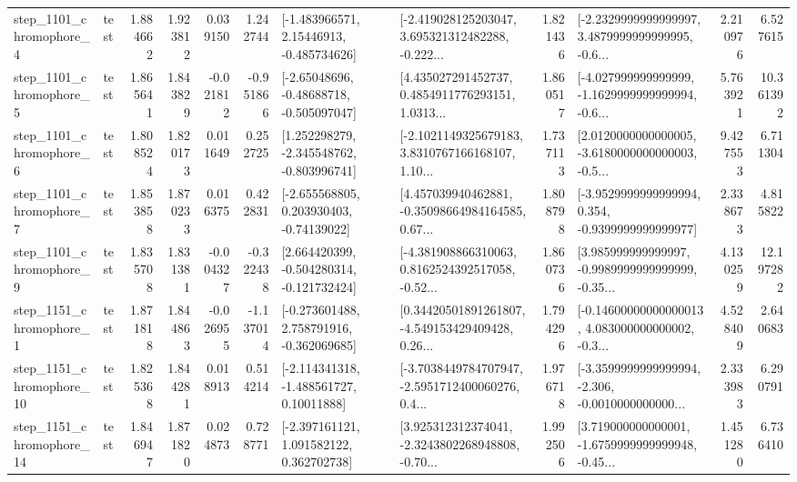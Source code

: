 \begin{tabular}{llrrrrllrlrr}
  step\_1101\_chromophore\_4 &      test &      1.884662 &    1.923812 &      0.039150 &  1.242744 &    [-1.483966571, 2.15446913, -0.485734626] &  [-2.419028125203047, 3.695321312482288, -0.222... &       1.821436 &  [-2.2329999999999997, 3.4879999999999995, -0.6... &            2.210976 &          6.527615 \\
  step\_1101\_chromophore\_5 &      test &      1.865641 &    1.843829 &     -0.021812 & -0.951866 &    [-2.65048696, -0.48688718, -0.505097047] &  [4.435027291452737, 0.4854911776293151, 1.0313... &       1.860517 &  [-4.027999999999999, -1.1629999999999994, -0.6... &            5.763921 &         10.361392 \\
  step\_1101\_chromophore\_6 &      test &      1.808524 &    1.820173 &      0.011649 &  0.252725 &   [1.252298279, -2.345548762, -0.803996741] &  [-2.1021149325679183, 3.8310767166168107, 1.10... &       1.737113 &  [2.0120000000000005, -3.6180000000000003, -0.5... &            9.427553 &          6.711304 \\
  step\_1101\_chromophore\_7 &      test &      1.853858 &    1.870233 &      0.016375 &  0.422831 &    [-2.655568805, 0.203930403, -0.74139022] &  [4.457039940462881, -0.35098664984164585, 0.67... &       1.808798 &  [-3.9529999999999994, 0.354, -0.9399999999999977] &            2.338673 &          4.815822 \\
  step\_1101\_chromophore\_9 &      test &      1.835708 &    1.831381 &     -0.004327 & -0.322438 &   [2.664420399, -0.504280314, -0.121732424] &  [-4.381908866310063, 0.8162524392517058, -0.52... &       1.860736 &  [3.985999999999997, -0.9989999999999999, -0.35... &            4.130259 &         12.197282 \\
  step\_1151\_chromophore\_1 &      test &      1.871818 &    1.844863 &     -0.026955 & -1.137014 &   [-0.273601488, 2.758791916, -0.362069685] &  [0.34420501891261807, -4.549153429409428, 0.26... &       1.794296 &  [-0.14600000000000013, 4.083000000000002, -0.3... &            4.528409 &          2.640683 \\
 step\_1151\_chromophore\_10 &      test &      1.825368 &    1.844281 &      0.018913 &  0.514214 &    [-2.114341318, -1.488561727, 0.10011888] &  [-3.7038449784707947, -2.5951712400060276, 0.4... &       1.976718 &  [-3.3599999999999994, -2.306, -0.0010000000000... &            2.333983 &          6.290791 \\
 step\_1151\_chromophore\_14 &      test &      1.846947 &    1.871820 &      0.024873 &  0.728771 &    [-2.397161121, 1.091582122, 0.362702738] &  [3.925312312374041, -2.3243802268948808, -0.70... &       1.992506 &  [3.719000000000001, -1.6759999999999948, -0.45... &            1.451280 &          6.736410 \\

\end{tabular}
